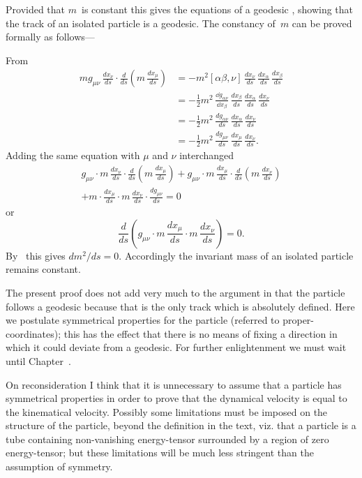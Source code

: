 \documentclass[12pt]{book}
\begin{document}
Provided that $m$~is constant this gives the equations of a geodesic ,
showing that the track of an isolated particle is a geodesic. The constancy of~$m$
can be proved formally as follows---

From~
\begin{align*}
  mg_{\mu\nu}\, \frac{dx_{\nu}}{ds} \cdot \frac{d}{ds} \left(m\, \frac{dx_{\mu}}{ds}\right)
  &= -m^{2} [\alpha\beta, \nu]\, \frac{dx_{\nu}}{ds}\, \frac{dx_{\alpha}}{ds}\, \frac{dx_{\beta}}{ds} \\
  &= -\tfrac{1}{2} m^{2} \, \frac{\dd g_{\alpha\nu}}{\dd x_{\beta}}\, \frac{dx_{\beta}}{ds}\, \frac{dx_{\alpha}}{ds}\, \frac{dx_{\nu}}{ds} \\
  &= -\tfrac{1}{2} m^{2} \, \frac{dg_{\alpha\nu}}{ds}\, \frac{dx_{\alpha}}{ds}\, \frac{dx_{\nu}}{ds} \\
  &= -\tfrac{1}{2} m^{2} \, \frac{dg_{\mu\nu}}{ds}\, \frac{dx_{\mu}}{ds}\, \frac{dx_{\nu}}{ds}.
\end{align*}
Adding the same equation with $\mu$ and $\nu$ interchanged
\begin{multline*}
g_{\mu\nu} \cdot m\, \frac{dx_{\nu}}{ds} \cdot \frac{d}{ds} \left(m\, \frac{dx_{\mu}}{ds}\right)
+ g_{\mu\nu} \cdot m\, \frac{dx_{\mu}}{ds} \cdot \frac{d}{ds} \left(m\, \frac{dx_{\nu}}{ds}\right) \\
+ m \cdot \frac{dx_{\mu}}{ds} \cdot m\, \frac{dx_{\nu}}{ds} \cdot \frac{dg_{\mu\nu}}{ds} = 0
\end{multline*}
or
\[
\frac{d}{ds} \left(g_{\mu\nu} \cdot m\, \frac{dx_{\mu}}{ds} \cdot m\, \frac{dx_{\nu}}{ds}\right) = 0.
\]
By~ this gives $dm^{2}/ds = 0$. Accordingly the invariant mass of an isolated
particle remains constant.

The present proof does not add very much to the argument in  that
the particle follows a geodesic because that is the only track which is absolutely
defined. Here we postulate symmetrical properties for the particle
(referred to proper\hyp{}coordinates); this has the effect that there is no means of
fixing a direction in which it could deviate from a geodesic. For further
enlightenment we must wait until Chapter~\@.

On reconsideration I think that it is unnecessary to assume that a particle has symmetrical properties in order
to prove that the dynamical velocity is equal to the kinematical velocity.
Possibly some limitations must be imposed on the structure of the particle, beyond the definition in the text,
viz. that a particle is a tube containing non\hyp{}vanishing energy\hyp{}tensor surrounded by a region of zero energy\hyp{}tensor;
but these limitations will be much less stringent than the assumption of symmetry.
\end{document}
